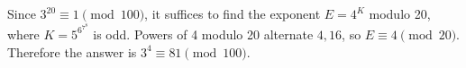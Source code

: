 Since $3^{20}\equiv1\pmod{100}$, it suffices to find the exponent $E=4^K$ modulo 20, where $K=5^{6^{7^8}}$ is odd. Powers of 4 modulo 20 alternate $4,16$, so $E\equiv4\pmod{20}$. Therefore the answer is $3^4\equiv\boxed{81}\pmod{100}$.
